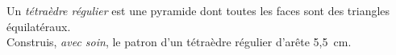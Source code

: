 
Un {\em tétraèdre régulier} est une pyramide dont toutes les faces
sont des triangles équilatéraux.
\\Construis, {\em avec soin}, le patron d'un tétraèdre régulier
d'arête 5,5~cm.